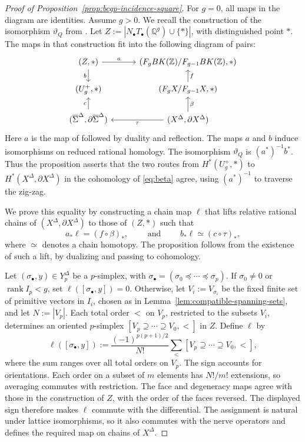 \documentclass[12 pt]{amsart}
\newcommand{\QQ}{\mathbb{Q}}
\newcommand{\ZZ}{\mathbb{Z}}
\newcommand{\rank}{\operatorname{rank}}
\newcommand{\<}{\langle}
\renewcommand{\>}{\rangle}
\theoremstyle{definition}
\begin{document}
\begin{proof}[Proof of Proposition~\ref{prop:bcgp-incidence-square}]
For $g = 0$, all maps in the diagram are identities. Assume $g > 0$. We recall the construction of the isomorphism $\vartheta_Q$ from \cite[\S2.4]{BCGP}. Let $Z := |N_\bullet T_\bullet(\QQ^g) \cup \{*\} |$, with distinguished point $*$. The maps in that construction fit into the following diagram of pairs:
\begin{equation}\label{eq:beta}
\begin{tikzcd}[column sep=3em,row sep=1.5em]
(Z, *) \arrow[r,"a"] \arrow[d,"b"'] & (F_g BK(\ZZ)/F_{g - 1} BK(\ZZ), *) \\
(U_g^+, *) & (F_g X/F_{g - 1} X, *) \arrow[u,"f"'] \\
(\overline \Sigma^\Delta, \partial \overline \Sigma^\Delta) \arrow[u,"c"] & (X^\Delta, \partial X^\Delta) \arrow[u,"\beta"'] \arrow[l,"\tau"]
\end{tikzcd}
\end{equation}
Here $a$ is the map of \cite[\S2.4]{BCGP} followed by duality and reflection. The maps $a$ and $b$ induce isomorphisms on reduced rational homology. The isomorphism $\vartheta_Q$ is $(a^*)^{-1} b^*$. Thus the proposition asserts that the two routes from $H^*(U_g^+, *)$ to $H^*(X^\Delta, \partial X^\Delta)$ in the cohomology of \eqref{eq:beta} agree, using $(a^*)^{-1}$ to traverse the zig-zag.

We prove this equality by constructing a chain map $\ell$ that lifts relative rational chains of $(X^\Delta, \partial X^\Delta)$ to those of $(Z, *)$ such that
\begin{equation} \label{eq:lift}
a_* \ell = (f \circ \beta)_*, \qquad \mbox{ and } \qquad b_* \ell \simeq (c \circ \tau)_*,
\end{equation}
where $\simeq$ denotes a chain homotopy. The proposition follows from the existence of such a lift, by dualizing and passing to cohomology.

Let $(\sigma_\bullet, y) \in Y_p^\Delta$ be a $p$-simplex, with $\sigma_\bullet = (\sigma_0 \preceq \cdots \preceq \sigma_p)$. If $\sigma_0 \neq 0$ or $\rank I_p < g$, set $\ell([\sigma_\bullet, y]) = 0$. Otherwise, let $V_i := V_{\sigma_i}$ be the fixed finite set of primitive vectors in $I_i$,  chosen as in Lemma~\ref{lem:compatible-spanning-sets}, and let $N := |V_p |$. Each total order $<$ on $V_p$, restricted to the subsets $V_i$, determines an oriented $p$-simplex $[V_p \supseteq \cdots \supseteq V_0, <]$ in $Z$. Define $\ell$ by
\begin{equation} \label{eq:ell}
\ell([\sigma_\bullet, y]) := \frac{(-1)^{p(p + 1)/2}}{N!} \sum_<[V_p \supseteq \cdots \supseteq V_0, <],
\end{equation}
where the sum ranges over all total orders on $V_p$. The sign accounts for orientations. Each order on a subset of $m$ elements has $N!/m!$ extensions, so averaging commutes with restriction. The face and degeneracy maps agree with those in the construction of $Z$, with the order of the faces reversed. The displayed sign therefore makes $\ell$ commute with the differential. The assignment is natural under lattice isomorphisms, so it also commutes with the nerve operators and defines the required map on chains of $X^\Delta$.


\end{proof}
\end{document}

